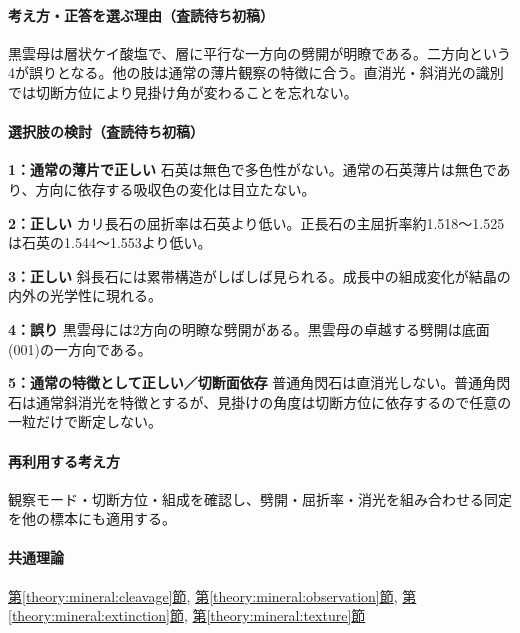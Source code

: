 \paragraph{考え方・正答を選ぶ理由（査読待ち初稿）} 黒雲母は層状ケイ酸塩で、層に平行な一方向の劈開が明瞭である。二方向という4が誤りとなる。他の肢は通常の薄片観察の特徴に合う。直消光・斜消光の識別では切断方位により見掛け角が変わることを忘れない。

\paragraph{選択肢の検討（査読待ち初稿）}\mbox{}\par

\noindent\textbf{1：通常の薄片で正しい} 石英は無色で多色性がない。通常の石英薄片は無色であり、方向に依存する吸収色の変化は目立たない。\par

\noindent\textbf{2：正しい} カリ長石の屈折率は石英より低い。正長石の主屈折率約1.518〜1.525は石英の1.544〜1.553より低い。\par

\noindent\textbf{3：正しい} 斜長石には累帯構造がしばしば見られる。成長中の組成変化が結晶の内外の光学性に現れる。\par

\noindent\textbf{4：誤り} 黒雲母には2方向の明瞭な劈開がある。黒雲母の卓越する劈開は底面(001)の一方向である。\par

\noindent\textbf{5：通常の特徴として正しい／切断面依存} 普通角閃石は直消光しない。普通角閃石は通常斜消光を特徴とするが、見掛けの角度は切断方位に依存するので任意の一粒だけで断定しない。\par

\paragraph{再利用する考え方} 観察モード・切断方位・組成を確認し、劈開・屈折率・消光を組み合わせる同定を他の標本にも適用する。

\paragraph{共通理論} \hyperref[theory:mineral:cleavage]{第\ref*{theory:mineral:cleavage}節}, \hyperref[theory:mineral:observation]{第\ref*{theory:mineral:observation}節}, \hyperref[theory:mineral:extinction]{第\ref*{theory:mineral:extinction}節}, \hyperref[theory:mineral:texture]{第\ref*{theory:mineral:texture}節}

